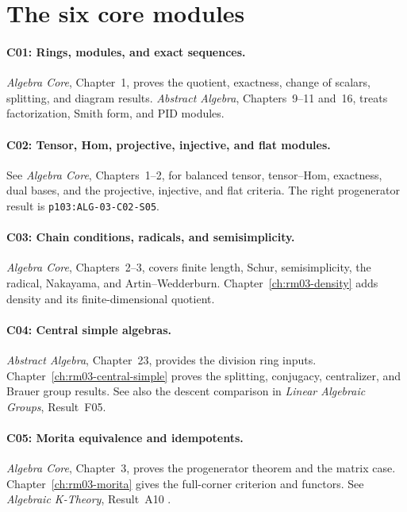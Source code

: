 \documentclass[11pt,oneside,openany]{book}
\theoremstyle{definition}
\theoremstyle{remark}
\begin{document}
\section*{The six core modules}

\paragraph{C01: Rings, modules, and exact sequences.}
\emph{Algebra Core}, Chapter~1, proves the quotient, exactness, change
of scalars, splitting, and diagram results. \emph{Abstract Algebra},
Chapters~9--11 and~16, treats factorization, Smith form, and PID modules.

\paragraph{C02: Tensor, Hom, projective, injective, and flat modules.}
See \emph{Algebra Core}, Chapters~1--2, for balanced tensor, tensor--Hom,
exactness, dual bases, and the projective, injective, and flat criteria.
The right progenerator result is \texttt{p103:ALG-03-C02-S05}.

\paragraph{C03: Chain conditions, radicals, and semisimplicity.}
\emph{Algebra Core}, Chapters~2--3, covers finite length, Schur,
semisimplicity, the radical, Nakayama, and Artin--Wedderburn.
Chapter~\ref{ch:rm03-density} adds density and its finite-dimensional quotient.

\paragraph{C04: Central simple algebras.}
\emph{Abstract Algebra}, Chapter~23, provides the division ring inputs.
Chapter~\ref{ch:rm03-central-simple} proves the splitting, conjugacy,
centralizer, and Brauer group results. See also the descent comparison
in \emph{Linear Algebraic Groups}, Result~F05.

\paragraph{C05: Morita equivalence and idempotents.}
\emph{Algebra Core}, Chapter~3, proves the progenerator theorem and
the matrix case. Chapter~\ref{ch:rm03-morita} gives the full-corner criterion
and functors. See \emph{Algebraic K-Theory}, Result~A10 \cite{ktheory}.
\end{document}
